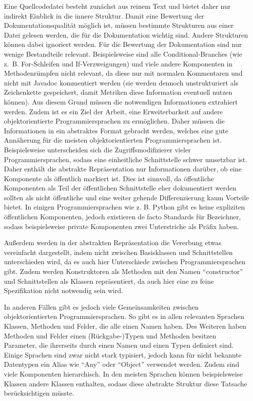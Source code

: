 \hfill
Eine Quellcodedatei besteht zunächst aus reinem Text und bietet daher nur indirekt Einblick in die innere Struktur. Damit eine Bewertung der Dokumentationsqualität möglich ist, müssen bestimmte Strukturen aus einer Datei gelesen werden, die für die Dokumentation wichtig sind. Andere Strukturen können dabei ignoriert werden. Für die Bewertung der Dokumentation sind nur wenige Bestandteile relevant. Beispielsweise sind alle Conditional-Branches (wie z.~B.  For-Schleifen und If-Verzweigungen) und viele andere Komponenten in Methodenrümpfen nicht relevant, da diese nur mit normalen Kommentaren und nicht mit Javadoc kommentiert werden (sie werden dennoch unstrukturiert als Zeichenkette gespeichert, damit Metriken diese Information eventuell nutzen können). Aus diesem Grund müssen die notwendigen Informationen extrahiert werden. Zudem ist es ein Ziel der Arbeit, eine Erweiterbarkeit auf andere objektorientierte Programmiersprachen zu ermöglichen. Daher müssen die Informationen in ein abstraktes Format gebracht werden, welches eine gute Annäherung für die meisten objektorientierten Programmiersprachen ist. Beispielsweise unterscheiden sich die Zugriffsmodifizierer vieler Programmiersprachen, sodass eine einheitliche Schnittstelle schwer umsetzbar ist. Daher enthält die abstrakte Repräsentation nur Informationen darüber, ob eine Komponente als öffentlich markiert ist. Dies ist sinnvoll, da öffentliche Komponenten als Teil der öffentlichen Schnittstelle eher dokumentiert werden sollten als nicht öffentliche und eine weiter gehende Differenzierung kaum Vorteile bietet. In einigen Programmiersprachen wie z. B. Python gibt es keine expliziten öffentlichen Komponenten, jedoch existieren de facto Standards für Bezeichner, sodass beispielsweise private Komponenten zwei Unterstriche als Präfix haben.

Außerdem werden in der abstrakten Repräsentation die Vererbung etwas vereinfacht dargestellt, indem nicht zwischen Basisklassen und Schnittstellen unterschieden wird, da es auch hier Unterschiede zwischen Programmiersprachen gibt. Zudem werden Konstruktoren als Methoden mit den Namen \enquote{constructor} und Schnittstellen als Klassen repräsentiert, da auch hier eine zu feine Spezifikation nicht notwendig sein wird.  

  

In anderen Fällen gibt es jedoch viele Gemeinsamkeiten zwischen objektorientierten Programmiersprachen. So gibt es in  allen relevanten Sprachen Klassen, Methoden und Felder, die alle einen Namen haben. Des Weiteren haben Methoden und Felder einen (Rückgabe-)Typen und Methoden besitzen Parameter, die ihrerseits durch einen Namen und einen Typen definiert sind. Einige Sprachen sind zwar nicht stark typisiert, jedoch kann für nicht bekannte Datentypen ein Alias wie \enquote{Any} oder  \enquote{Object} verwendet werden.  Zudem sind viele Komponenten hierarchisch. In den meisten Sprachen können beispielsweise Klassen andere Klassen enthalten, sodass diese abstrakte Struktur diese Tatsache berücksichtigen müsste. 

